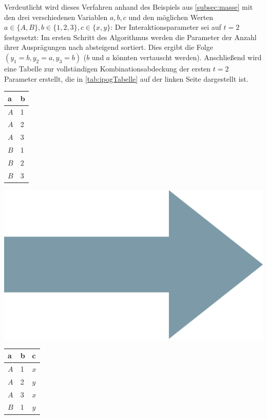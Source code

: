 Verdeutlicht wird dieses Verfahren anhand des Beispiels aus \autoref{subsec:masse} mit den drei verschiedenen Variablen $a,b,c$ und den möglichen Werten $a \in \{A,B\}, b \in \{1,2,3\}, c \in \{x,y\}$: Der Interaktionsparameter sei auf $t = 2$ festgesetzt: Im ersten Schritt des Algorithmus werden die Parameter der Anzahl ihrer Ausprägungen nach absteigend sortiert. Dies ergibt die Folge $(y_1 = b, y_2 = a, y_3 = b)$ ($b$ und $a$ könnten vertauscht werden). Anschließend wird eine Tabelle zur vollständigen Kombinationsabdeckung der ersten $t=2$ Parameter erstellt, die in \autoref{tab:ipogTabelle} auf der linken Seite dargestellt ist.

\begin{table}[!htb]
    \begin{minipage}{0.25\linewidth}
      \raggedleft
        \begin{tabular}{|l|l|}
			\cellcolor{grauinfo}a   & \cellcolor{grauinfo}b  \\ \hline
			$A$ & 1 \\ \hline
			$A$ & 2 \\ \hline
			$A$ & 3 \\ \hline
			$B$ & 1 \\ \hline
			$B$ & 2 \\ \hline
			$B$ & 3 \\ \hline
		\end{tabular}
    \end{minipage}%
	\begin{minipage}{0.35\linewidth}
      \centering
		\includegraphics[width=0.4\linewidth]{images/arrow.jpg}
    \end{minipage} 
    \begin{minipage}{0.25\linewidth}
      \raggedright
        \begin{tabular}{|l|l|l|}
			\cellcolor{grauinfo}a   & \cellcolor{grauinfo}b & \cellcolor{grauinfo}c   \\ \hline
			$A$ & 1 & $x$ \\ \hline
			$A$ & 2 & $y$ \\ \hline
			$A$ & 3 & $x$ \\ \hline
			$B$ & 1 & $y$ \\ \hline

\end{tabular}
\end{minipage}
\end{table}
